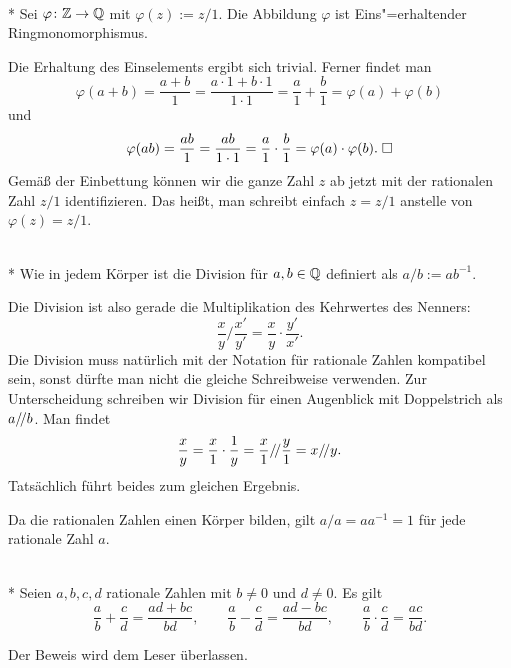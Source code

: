\newpage
\begin{Satz}\mbox{}\\*
Sei $\varphi\colon\mathbb Z\to\mathbb Q$ mit $\varphi(z):=z/1$. Die
Abbildung $\varphi$ ist Eins"=erhaltender Ringmonomorphismus.
\end{Satz}
 Die Erhaltung des Einselements ergibt sich
trivial. Ferner findet man
\[\varphi(a+b) = \frac{a+b}{1} = \frac{a\cdot 1+b\cdot 1}{1\cdot 1}
= \frac{a}{1}+\frac{b}{1} = \varphi(a)+\varphi(b)\]
und
\[\varphi(ab) = \frac{ab}{1} = \frac{ab}{1\cdot 1} = \frac{a}{1}\cdot\frac{b}{1}
= \varphi(a)\cdot\varphi(b).\;\Box\]
Gemäß der Einbettung können wir die ganze Zahl $z$ ab jetzt
mit der rationalen Zahl $z/1$ identifizieren. Das heißt, man schreibt
einfach $z=z/1$ anstelle von $\varphi(z)=z/1$.

\begin{Definition}\mbox{}\\*
Wie in jedem Körper ist die Division für $a,b\in\mathbb Q$
definiert als $a/b := ab^{-1}$.
\end{Definition}
Die Division ist also gerade die Multiplikation des Kehrwertes
des Nenners:
\[\frac{x}{y}/\frac{x'}{y'} = \frac{x}{y}\cdot\frac{y'}{x'}.\]
Die Division muss natürlich mit der Notation für rationale Zahlen
kompatibel sein, sonst dürfte man nicht die gleiche Schreibweise
verwenden. Zur Unterscheidung schreiben wir Division für einen
Augenblick mit Doppelstrich als $a/\!/ b$. Man findet
\[\frac{x}{y} = \frac{x}{1}\cdot\frac{1}{y}
= \frac{x}{1}/\!/\frac{y}{1} = x/\!/ y.\]
Tatsächlich führt beides zum gleichen Ergebnis.

Da die rationalen Zahlen einen Körper bilden, gilt $a/a=aa^{-1}=1$
für jede rationale Zahl $a$.

\begin{Satz}\mbox{}\\*
Seien $a,b,c,d$ rationale Zahlen mit $b\ne 0$ und $d\ne 0$. Es gilt
\[\frac{a}{b}+\frac{c}{d} = \frac{ad+bc}{bd},
\qquad \frac{a}{b}-\frac{c}{d} = \frac{ad-bc}{bd},
\qquad \frac{a}{b}\cdot\frac{c}{d} = \frac{ac}{bd}.\]
\end{Satz}
Der Beweis wird dem Leser überlassen.
